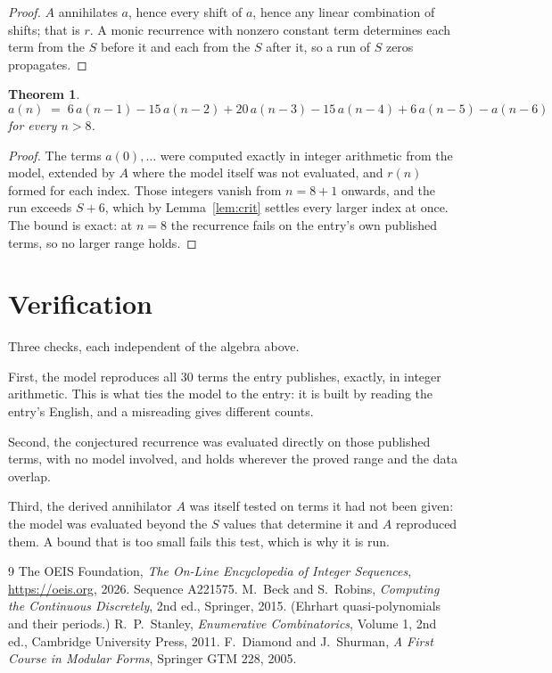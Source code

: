 \documentclass[11pt,a4paper]{article}
\theoremstyle{plain}
\newtheorem{theorem}{Theorem}
\theoremstyle{definition}
\begin{document}
\begin{proof}
$A$ annihilates $a$, hence every shift of $a$, hence any linear combination of shifts; that is
$r$. A monic recurrence with nonzero constant term determines each term from the $S$ before it
and each from the $S$ after it, so a run of $S$ zeros propagates.
\end{proof}

\begin{theorem}
\[
a(n)\;=\;6\,a(n-1) - 15\,a(n-2) + 20\,a(n-3) - 15\,a(n-4) + 6\,a(n-5) - a(n-6)
\]
for every $n>8$.
\end{theorem}

\begin{proof}
The terms $a(0),\dots$ were computed exactly in integer arithmetic from the model, extended by
$A$ where the model itself was not evaluated, and $r(n)$ formed for each index. Those integers
vanish from $n=8+1$ onwards, and the run exceeds $S+6$, which by
Lemma~\ref{lem:crit} settles every larger index at once. The bound is exact: at $n=8$ the recurrence fails on the entry's own published terms, so no larger range holds.
\end{proof}

\section{Verification}

Three checks, each independent of the algebra above.

First, the model reproduces all $30$ terms the entry publishes, exactly, in integer
arithmetic. This is what ties the model to the entry: it is built by reading the entry's
English, and a misreading gives different counts.

Second, the conjectured recurrence was evaluated directly on those published terms, with no
model involved, and holds wherever the proved range and the data overlap.

Third, the derived annihilator $A$ was itself tested on terms it had not been given: the model
was evaluated beyond the $S$ values that determine it and $A$ reproduced them. A bound that is
too small fails this test, which is why it is run.

\begin{thebibliography}{9}
 The OEIS Foundation, \emph{The On-Line Encyclopedia of Integer
Sequences}, \url{https://oeis.org}, 2026. Sequence A221575.
 M.~Beck and S.~Robins, \emph{Computing the Continuous Discretely},
2nd ed., Springer, 2015. (Ehrhart quasi-polynomials and their periods.)
 R.~P.~Stanley, \emph{Enumerative Combinatorics}, Volume 1, 2nd ed.,
Cambridge University Press, 2011.
 F.~Diamond and J.~Shurman, \emph{A First Course in Modular Forms},
Springer GTM 228, 2005.
\end{thebibliography}
\end{document}
